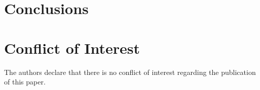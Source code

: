 \documentclass[11pt]{article}
\begin{document}
\section{Conclusions}
\label{section:conclusion}

\section*{Conflict of Interest}
\label{section:Conflict}

The authors declare that there is no conflict of interest regarding the publication of this paper.





\end{document}
